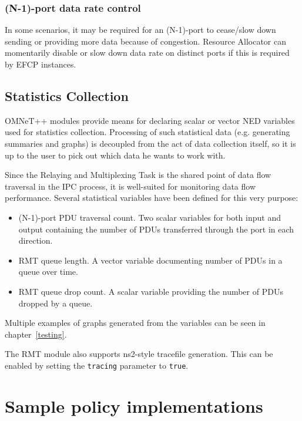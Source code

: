             \subsubsection{(N-1)-port data rate control}

                In some scenarios, it may be required for an (N-1)-port to cease/slow down sending or providing more data because of congestion. Resource Allocator can momentarily disable or slow down data rate on distinct ports if this is required by EFCP instances.


        \subsection{Statistics Collection}

            OMNeT++ modules provide means for declaring scalar or vector NED variables used for statistics collection. Processing of such statistical data (e.g. generating summaries and graphs) is decoupled from the act of data collection itself, so it is up to the user to pick out which data he wants to work with.

            Since the Relaying and Multiplexing Task is the shared point of data flow traversal in the IPC process, it is well-suited for monitoring data flow performance. Several statistical variables have been defined for this very purpose:

            \begin{itemize}
                \item (N-1)-port PDU traversal count. Two scalar variables for both input and output containing the number of PDUs transferred through the port in each direction.
                \item RMT queue length. A vector variable documenting number of PDUs in a queue over time.
                \item RMT queue drop count. A scalar variable providing the number of PDUs dropped by a queue.
            \end{itemize}

            Multiple examples of graphs generated from the variables can be seen in chapter~\ref{testing}.

            The RMT module also supports ns2-style tracefile generation. This can be enabled by setting the \texttt{tracing} parameter to \texttt{true}.

    \section{Sample policy implementations}

